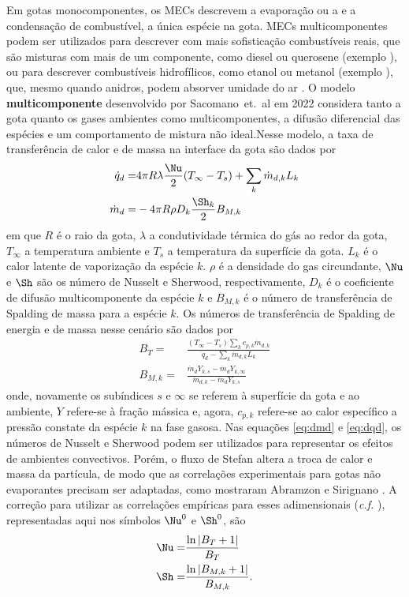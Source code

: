 Em gotas monocomponentes, os MECs descrevem a evaporação ou a e a condensação de combustível, a única espécie na gota.
MECs multicomponentes podem ser utilizados para descrever com mais sofisticação combustíveis reais, que são misturas com mais de um componente, como diesel ou querosene (exemplo \cite{FriedrichD2022,ShastryV2021,ShastryV2023,SekularacN2024}), ou para descrever combustíveis hidrofílicos, como etanol ou metanol (exemplo \cite{BojkoDesJardin2017CF,SacomanoF2024CF,SacomanoF2025CF,MaquaC2008,ZanuttoC2019,ChenL2016IJHMT}), que, mesmo quando anidros, podem absorver umidade do ar \cite{SacomanoF2024CF,SacomanoF2025CF}. 
O modelo \textbf{multicomponente} desenvolvido por Sacomano~et.~al em 2022 \cite{SacomanoF2022IJHMT} considera tanto a gota quanto os gases ambientes como multicomponentes, a difusão diferencial das espécies e um comportamento de mistura não ideal.Nesse modelo, a taxa de transferência de calor e de massa na interface da gota são dados por 
\begin{align}
    \dot q_d =& 4\pi R \lambda \frac{\Nu}{2}(T_\infty - T_s) + \sum_k \dot m_{d,k} L_k \label{eq:dmd} \\
    \dot m_d =& -4 \pi R \rho D_k \frac{\Sh_k}{2}B_{M,k} \label{eq:dqd}
\end{align}
em que $R$ é o raio da gota, $\lambda$ a condutividade térmica do gás ao redor da gota, $T_\infty$ a temperatura ambiente e $T_s$ a temperatura da superfície da gota. $L_k$ é o calor latente de vaporização da espécie $k$.
$\rho$ é a densidade do gas circundante, $\Nu$ e $\Sh$ são os número de Nusselt e Sherwood, respectivamente, $D_k$ é o coeficiente de difusão multicomponente da espécie $k$ e $B_{M,k}$ é o número de transferência de Spalding de massa para a espécie $k$.
Os números de transferência de Spalding de energia e de massa nesse cenário são dados por
\begin{align}
    B_T =& \frac
        {(T_\infty - T_s) \sum_k c_{p,k}\dot m_{d,k}}
        {\dot q_d - \sum_k \dot m_{d,k} L_k} \label{eq:B_T}\\
    B_{M,k} =& \frac
        {\dot m_d Y_{k,s} - \dot m_d Y_{k,\infty}}
        {\dot m_{d,k} - \dot m_d Y_{k,s}}\label{eq:B_Mk}
\end{align}
onde, novamente os subíndices $s$ e $\infty$ se referem à superfície da gota e ao ambiente, $Y$ refere-se à fração mássica e, agora, $c_{p,k}$ refere-se ao calor específico a pressão constate da espécie $k$ na fase gasosa.
Nas equações \eqref{eq:dmd} e \eqref{eq:dqd}, os números de Nusselt e Sherwood podem ser utilizados para representar os efeitos de ambientes convectivos.
Porém, o fluxo de Stefan altera a troca de calor e massa da partícula, de modo que as correlações experimentais para gotas não evaporantes precisam ser adaptadas, como mostraram Abramzon e Sirignano \cite{Sirignano1989}.
A correção para utilizar as correlações empíricas para esses adimensionais  (\emph{c.f.} \cite[eqs. (8) e (9)]{SacomanoF2025CF}), representadas aqui nos símbolos $\Nu^0$ e $\Sh^0$, são
\begin{align}
    \Nu =& \frac{\ln \left|B_T + 1\right|}{B_T} \\
    \Sh =& \frac{\ln \left|B_{M,k} + 1\right|}{B_{M,k}}.
\end{align}

